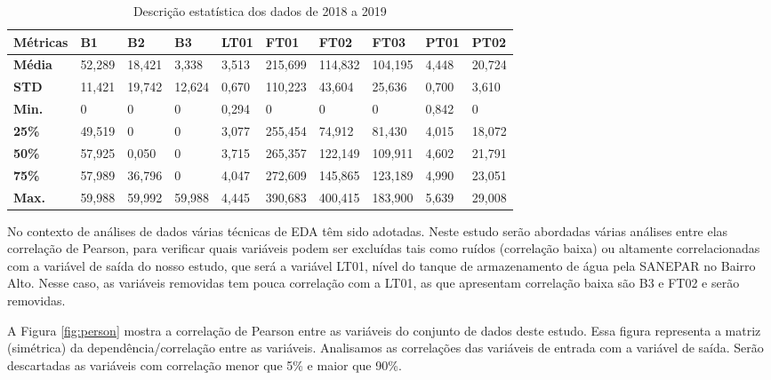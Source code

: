 \begin{table}[!htb]
	\centering
	\caption{Descrição estatística dos dados de 2018 a 2019}\label{tb:est}
	\begin{tabular}{@{}llllllllll@{}}
		\toprule
		\textbf{Métricas} & \textbf{B1} & \textbf{B2} & \textbf{B3} & \textbf{LT01} & \textbf{FT01} & \textbf{FT02} & \textbf{FT03} & \textbf{PT01} & \textbf{PT02} \\ \midrule
		\textbf{Média}    & 52,289      & 18,421      & 3,338       & 3,513         & 215,699       & 114,832       & 104,195       & 4,448         & 20,724        \\
		\textbf{STD}      & 11,421      & 19,742      & 12,624      & 0,670         & 110,223       & 43,604        & 25,636        & 0,700         & 3,610         \\
		\textbf{Min.}     & 0           & 0           & 0           & 0,294         & 0             & 0             & 0             & 0,842         & 0             \\
		\textbf{25\%}     & 49,519      & 0           & 0           & 3,077         & 255,454       & 74,912        & 81,430        & 4,015         & 18,072        \\
		\textbf{50\%}     & 57,925      & 0,050       & 0           & 3,715         & 265,357       & 122,149       & 109,911       & 4,602         & 21,791        \\
		\textbf{75\%}     & 57,989      & 36,796      & 0           & 4,047         & 272,609       & 145,865       & 123,189       & 4,990         & 23,051        \\
		\textbf{Max.}     & 59,988      & 59,992      & 59,988      & 4,445         & 390,683       & 400,415       & 183,900       & 5,639         & 29,008        \\ \bottomrule
	\end{tabular}
\end{table}

No contexto de análises de dados várias técnicas de EDA têm sido adotadas.
Neste estudo serão abordadas várias análises entre elas correlação de Pearson, para verificar quais variáveis podem ser excluídas tais como ruídos (correlação baixa) ou altamente correlacionadas com a variável de saída do nosso estudo, que será a variável LT01, nível do tanque de armazenamento de água pela SANEPAR no Bairro Alto. Nesse caso, as variáveis removidas tem pouca correlação com a LT01, as que apresentam correlação baixa são B3 e FT02 e serão removidas.

A Figura \ref{fig:person} mostra a correlação de Pearson entre as variáveis do conjunto de dados deste estudo. Essa figura representa a matriz (simétrica) da dependência/correlação entre as variáveis. Analisamos as correlações das variáveis de entrada com a variável de saída. Serão descartadas as variáveis com correlação menor que 5\% e maior que 90\%.


